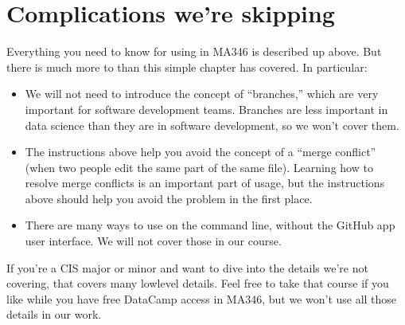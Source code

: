 \documentclass[letterpaper,10pt,english]{jupyterBook}
\begin{document}
\section{Complications we’re skipping}
\label{\detokenize{chapter-8-version-control:complications-we-re-skipping}}
\sphinxAtStartPar
Everything you need to know for using  in MA346 is described up above.  But there is much more to  than this simple chapter has covered.  In particular:
\begin{itemize}
\item {} 
\sphinxAtStartPar
We will not need to introduce the concept of “branches,” which are very important for software development teams.  Branches are less important in data science than they are in software development, so we won’t cover them.

\item {} 
\sphinxAtStartPar
The instructions above help you avoid the concept of a “merge conflict” (when two people edit the same part of the same file).  Learning how to resolve merge conflicts is an important part of  usage, but the instructions above should help you avoid the problem in the first place.

\item {} 
\sphinxAtStartPar
There are many ways to use  on the command line, without the GitHub app user interface.  We will not cover those in our course.

\end{itemize}

\sphinxAtStartPar
If you’re a CIS major or minor and want to dive into the details we’re not covering,  that covers many low\sphinxhyphen{}level details.  Feel free to take that course if you like while you have free DataCamp access in MA346, but we won’t use all those details in our work.
\end{document}

